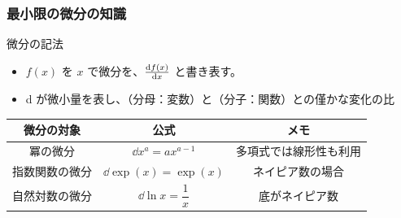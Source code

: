 \documentclass[unicode,12pt,aspectratio=169]{beamer}
\begin{document}
\begin{frame}
	\frametitle{最小限の微分の知識}
	\begin{block}{微分の記法}
		\begin{itemize}
			\item $f(x)$ を $x$ で微分を、$\dv{f(x)}{x}$ と書き表す。
			\item \alert{d が微小量}を表し、（分母：変数）と（分子：関数）との\alert{僅かな変化の比}
		\end{itemize}
	\end{block}
	\vspace{-3mm}
	\footnotesize
	\renewcommand{\arraystretch}{2}
	\begin{table}[tb]
		\begin{center}
			\begin{tabular}{|c|c|c|} \hline
				微分の対象		& 公式							& メモ \\ \hline \hline
				冪の微分		& $\dd{}x^a = ax^{a-1}$ 		&  多項式では線形性も利用\\ \hline
				指数関数の微分	& $\dd{}\exp(x) = \exp(x)$ 		&  ネイピア数の場合\\ \hline
				自然対数の微分	& $\dd{}\ln x = \dfrac{1}{x}$ 	& 底がネイピア数 \\ \hline
			\end{tabular}
		\end{center}
	\end{table}
	\renewcommand{\arraystretch}{1.}
\end{frame}
\end{document}
